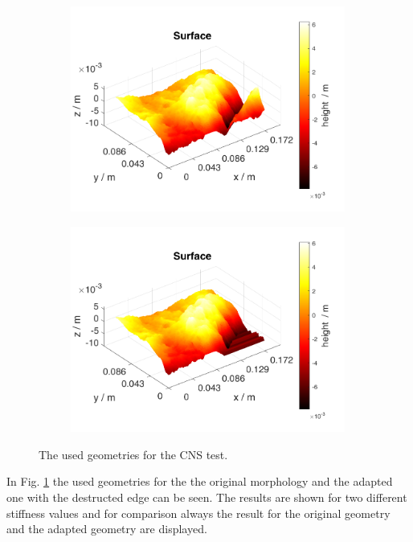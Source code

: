\begin{figure}
\begin{subfigure}[c]{0.48\textwidth}
\includegraphics[width=0.99\textwidth]{./figures/MEX3-2_SurfaceOrig.png}
\end{subfigure}
\begin{subfigure}[c]{0.48\textwidth}
\includegraphics[width=0.99\textwidth]{./figures/MEX3-2_SurfaceWithout.png}
\end{subfigure}
\caption{The used geometries for the CNS test.}
\label{fig:MEX3-2_Surface}
\end{figure}

In Fig. \ref{fig:MEX3-2_Surface} the used geometries for the the original morphology and the adapted one with the destructed edge can be seen. The results are shown for two different stiffness values and for comparison always the result for the original geometry and the adapted geometry are displayed.\\

